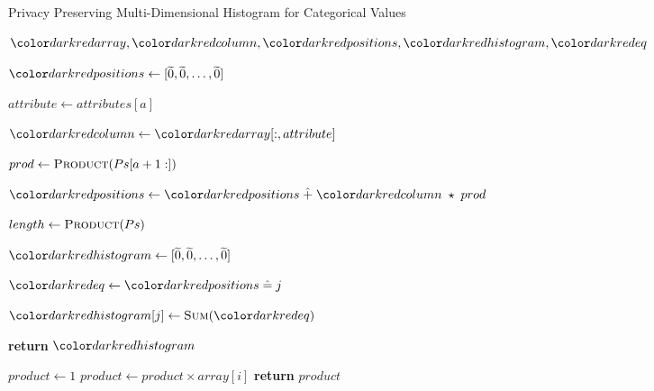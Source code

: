 \begin{algorithm}[H]
\caption{Privacy Preserving Multi-Dimensional Histogram for Categorical Values}\label{a:multidim-histogram-categorical}
\begin{algorithmic}[1]
\renewcommand{\algorithmicrequire}{\textbf{Private Vars:}}
\Require $\red{array}, \red{column}, \red{positions}, \red{histogram}, \red{eq}$


    \State
    $\red{positions} \gets [\enc{0}, \enc{0}, \dots, \enc{0}] $


      \State $attribute \gets attributes[a]$

      \State $\red{column} \gets \red{array}[:, attribute]$ 

      \State $prod \gets \textsc{Product}(Ps[a+1:])$ 

      \State $\red{positions} \gets \red{positions} \hplus \red{column} \hmul prod$

    \EndFor

    \State $length \gets \textsc{Product}(Ps)$

    \State $\red{histogram} \gets [\enc{0}, \enc{0}, \dots, \enc{0}]$



      \State $\red{eq} \gets \red{positions} \heq j$

      \State $\red{histogram}[j] \gets \textsc{Sum}(\red{eq})$

    \EndFor

    \State \textbf{return} {$\red{histogram}$}
\EndProcedure

\begin{spacing}{0.5}
\end{spacing}

    \State $product \gets 1$
        \State $product \gets product \times array[i]$
    \EndFor
    \State \textbf{return} {$product$}
\EndProcedure

\end{algorithmic}
\end{algorithm}
